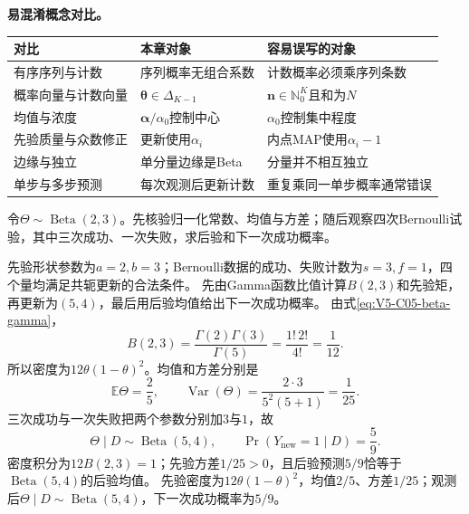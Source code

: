 \begin{samepage}
\label{struct:V5-C05-CH31}
\textbf{易混淆概念对比。}
\begin{center}
\small
\begin{tabularx}{\linewidth}{@{}l X X@{}}
\toprule 对比 & 本章对象 & 容易误写的对象\\ \midrule
有序序列与计数 & 序列概率无组合系数 & 计数概率必须乘序列条数\\
概率向量与计数向量 & $\boldsymbol\theta\in\Delta_{K-1}$ & $\boldsymbol n\in\mathbb N_0^K$且和为$N$\\
均值与浓度 & $\boldsymbol\alpha/\alpha_0$控制中心 & $\alpha_0$控制集中程度\\
先验质量与众数修正 & 更新使用$\alpha_i$ & 内点MAP使用$\alpha_i-1$\\
边缘与独立 & 单分量边缘是Beta & 分量并不相互独立\\
单步与多步预测 & 每次观测后更新计数 & 重复乘同一单步概率通常错误\\
\bottomrule
\end{tabularx}
\end{center}
\end{samepage}

\label{struct:V5-C05-CH32}
\begin{example}[Beta特例与Bernoulli更新]\label{exm:V5-C05-beta-update}
令$\Theta\sim\operatorname{Beta}(2,3)$。先核验归一化常数、均值与方差；随后观察四次Bernoulli试验，其中三次成功、一次失败，求后验和下一次成功概率。
\end{example}
\begin{solution}
\SolGiven 先验形状参数为$a=2,b=3$；Bernoulli数据的成功、失败计数为$s=3,f=1$，四个量均满足共轭更新的合法条件。
\SolPlan 先由Gamma函数比值计算$B(2,3)$和先验矩，再更新为$(5,4)$，最后用后验均值给出下一次成功概率。
\SolDerive
\nopagebreak[4]
由式\eqref{eq:V5-C05-beta-gamma}，
\[
B(2,3)=\frac{\Gamma(2)\Gamma(3)}{\Gamma(5)}
=\frac{1!\,2!}{4!}=\frac1{12}.
\]
所以密度为$12\theta(1-\theta)^2$。均值和方差分别是
\[
\mathbb E\Theta=\frac25,\qquad
\operatorname{Var}(\Theta)=\frac{2\cdot3}{5^2(5+1)}=\frac1{25}.
\]
三次成功与一次失败把两个参数分别加$3$与$1$，故
\[
\Theta\mid D\sim\operatorname{Beta}(5,4),
\qquad
\Pr(Y_{\mathrm{new}}=1\mid D)=\frac59.
\]
\SolCheck 密度积分为$12B(2,3)=1$；先验方差$1/25>0$，且后验预测$5/9$恰等于$\operatorname{Beta}(5,4)$的后验均值。
\SolAnswer 先验密度为$12\theta(1-\theta)^2$，均值$2/5$、方差$1/25$；观测后$\Theta\mid D\sim\operatorname{Beta}(5,4)$，下一次成功概率为$5/9$。
\end{solution}

